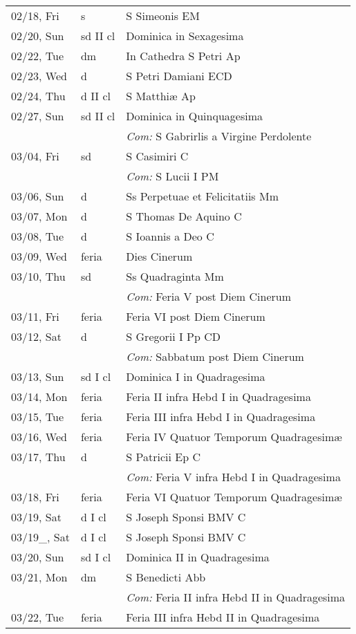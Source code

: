 \documentclass[10pt]{article}
\begin{document}
\begin{longtable}{ l l l }
02/18, Fri & s & S Simeonis EM\\
02/20, Sun & sd II cl & Dominica in Sexagesima\\
02/22, Tue & dm & In Cathedra S Petri Ap\\
02/23, Wed & d & S Petri Damiani ECD\\
02/24, Thu & d II cl & S Matthiæ Ap\\
02/27, Sun & sd II cl & Dominica in Quinquagesima\\
 & & \textit{Com:} S Gabrirlis a Virgine Perdolente\\
03/04, Fri & sd & S Casimiri C\\
 & & \textit{Com:} S Lucii I PM\\
03/06, Sun & d & Ss Perpetuae et Felicitatiis Mm\\
03/07, Mon & d & S Thomas De Aquino C\\
03/08, Tue & d & S Ioannis a Deo C\\
03/09, Wed & feria & Dies Cinerum\\
03/10, Thu & sd & Ss Quadraginta Mm\\
 & & \textit{Com:} Feria V post Diem Cinerum\\
03/11, Fri & feria & Feria VI post Diem Cinerum\\
03/12, Sat & d & S Gregorii I Pp CD\\
 & & \textit{Com:} Sabbatum post Diem Cinerum\\
03/13, Sun & sd I cl & Dominica I in Quadragesima\\
03/14, Mon & feria & Feria II infra Hebd I in Quadragesima\\
03/15, Tue & feria & Feria III infra Hebd I in Quadragesima\\
03/16, Wed & feria & Feria IV Quatuor Temporum Quadragesimæ\\
03/17, Thu & d & S Patricii Ep C\\
 & & \textit{Com:} Feria V infra Hebd I in Quadragesima\\
03/18, Fri & feria & Feria VI Quatuor Temporum Quadragesimæ\\
03/19, Sat & d I cl & S Joseph Sponsi BMV C\\
03/19_, Sat & d I cl & S Joseph Sponsi BMV C\\
03/20, Sun & sd I cl & Dominica II in Quadragesima\\
03/21, Mon & dm & S Benedicti Abb\\
 & & \textit{Com:} Feria II infra Hebd II in Quadragesima\\
03/22, Tue & feria & Feria III infra Hebd II in Quadragesima\\

\end{longtable}
\end{document}
